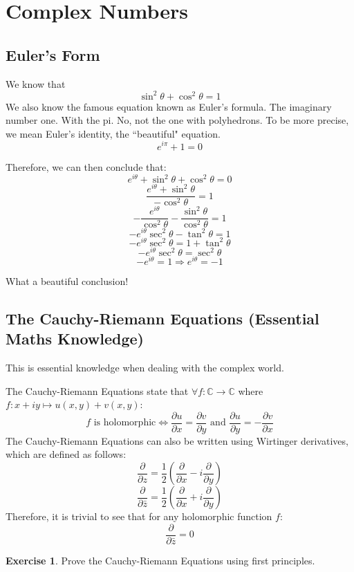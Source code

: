\documentclass[a4paper]{article}
\theoremstyle{plain}
\theoremstyle{definition}
\newtheorem{exercise}{Exercise}[section]
\theoremstyle{remark}
\newcommand{\sectionSpace}{\vspace{2em}} %
\begin{document}
\sectionSpace
\section{Complex Numbers}
    \subsection{Euler's Form}
    We know that
    $$\sin^2\theta + \cos^2\theta = 1$$
    We also know the famous equation known as Euler's formula. The imaginary number one. With the pi. No, not the one with polyhedrons. To be more precise, we mean Euler's identity, the ``beautiful" equation.
    $$e^{i\pi} + 1 = 0$$

    Therefore, we can then conclude that:
    $$e^{i\theta} + \sin^2\theta + \cos^2\theta = 0$$
    $$\frac{e^{i\theta} + \sin^2\theta}{-\cos^2\theta} = 1$$
    $$-\frac{e^{i\theta}}{\cos^2\theta} -\frac{\sin^2\theta}{\cos^2\theta} = 1$$
    $$-e^{i\theta}\sec^2\theta -\tan^2\theta = 1$$
    $$-e^{i\theta}\sec^2\theta = 1 + \tan^2\theta$$
    $$-e^{i\theta}\sec^2\theta = \sec^2\theta$$
    $$-e^{i\theta} = 1 \Rightarrow e^{i\theta} = -1$$

    What a beautiful conclusion!

    \subsection{The Cauchy-Riemann Equations (Essential Maths Knowledge)}
    This is essential knowledge when dealing with the complex world.

    The Cauchy-Riemann Equations state that $\forall f:\mathbb{C}\to\mathbb{C}$ where $f:x+iy\mapsto u(x,y)+v(x,y)$:
    $$f \text{ is holomorphic}\Leftrightarrow \frac {\partial u}{\partial x}=\frac {\partial v}{\partial y} \text { and }\frac {\partial u}{\partial y}=-{\frac {\partial v}{\partial x}}$$
    The Cauchy-Riemann Equations can also be written using Wirtinger derivatives, which are defined as follows:
    $$\frac {\partial }{\partial z}={\frac {1}{2}}\left({\frac {\partial }{\partial x}}-i{\frac {\partial }{\partial y}}\right)$$
    $${\frac {\partial }{\partial {\bar {z}}}}={\frac {1}{2}}\left({\frac {\partial }{\partial x}}+i{\frac {\partial }{\partial y}}\right)$$
    Therefore, it is trivial to see that for any holomorphic function $f$:
    $${\frac {\partial }{\partial {\bar {z}}}}=0$$
    \begin{exercise}
        Prove the Cauchy-Riemann Equations using first principles.
    \end{exercise}
\end{document}

